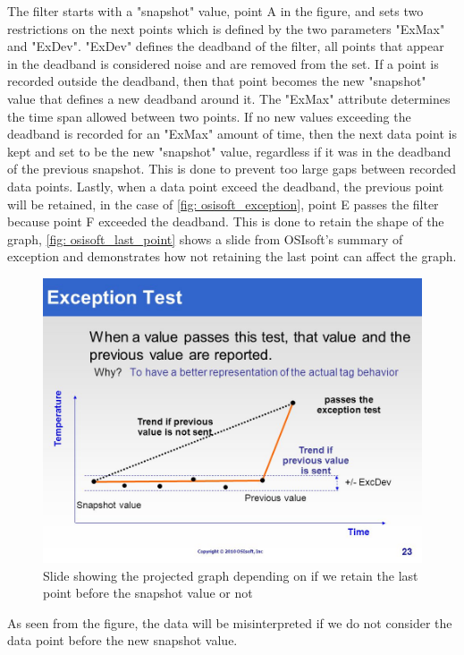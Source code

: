 \documentclass[main.tex]{subfiles}
\begin{document}
The filter starts with a "snapshot" value, point A in the figure, and sets two restrictions on the next points which is defined by the two parameters "ExMax" and "ExDev". "ExDev" defines the deadband of the filter, all points that appear in the deadband is considered noise and are removed from the set. If a point is recorded outside the deadband, then that point becomes the new "snapshot" value that defines a new deadband around it. The "ExMax" attribute determines the time span allowed between two points. If no new values exceeding the deadband is recorded for an "ExMax" amount of time, then the next data point is kept and set to be the new "snapshot" value, regardless if it was in the deadband of the previous snapshot. This is done to prevent too large gaps between recorded data points. Lastly, when a data point exceed the deadband, the previous point will be retained, in the case of \autoref{fig: osisoft_exception}, point E passes the filter because point F exceeded the deadband. This is done to retain the shape of the graph, \autoref{fig: osisoft_last_point} shows a slide from OSIsoft's summary of exception and demonstrates how not retaining the last point can affect the graph.

\begin{figure}[!htpb]
    \centering
    \includegraphics[width=12cm, scale=4]{images/osisoft_last_point.jpg}
    \caption{Slide showing the projected graph depending on if we retain the last point before the snapshot value or not\cite{osisoft_exception}}
    \label{fig: osisoft_last_point}
\end{figure}
\FloatBarrier 
 
 As seen from the figure, the data will be misinterpreted if we do not consider the data point before the new snapshot value. 
 
\end{document}
